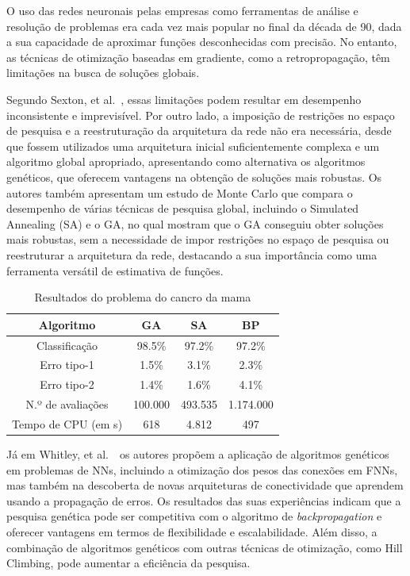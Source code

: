 O uso das redes neuronais pelas empresas como ferramentas de análise e resolução de problemas era cada vez mais popular no final da década de 90, dada a sua capacidade de aproximar funções desconhecidas com precisão.
No entanto, as técnicas de otimização baseadas em gradiente, como a retropropagação, têm limitações na busca de soluções globais.

Segundo Sexton, et al.~\cite{Sexton1998, Sexton1999}, essas limitações podem resultar em desempenho inconsistente e imprevisível.
Por outro lado, a imposição de restrições no espaço de pesquisa e a reestruturação da arquitetura da rede não era necessária, desde que fossem utilizados uma arquitetura inicial suficientemente complexa e um algoritmo global apropriado, apresentando como alternativa os algoritmos genéticos, que oferecem vantagens na obtenção de soluções mais robustas.
Os autores também apresentam um estudo de Monte Carlo que compara o desempenho de várias técnicas de pesquisa global, incluindo o Simulated Annealing (SA) e o GA, no qual mostram que o GA conseguiu obter soluções mais robustas, sem a necessidade de impor restrições no espaço de pesquisa ou reestruturar a arquitetura da rede, destacando a sua importância como uma ferramenta versátil de estimativa de funções.

\begin{table}[htbp]
    \centering
    \caption{Resultados do problema do cancro da mama\cite{Sexton1999}}
    \begin{tabular}{cccc}
        \hline
        Algoritmo & GA      & SA      & BP        \\ \hline
        Classificação     & 98.5\%  & 97.2\%  & 97.2\%    \\
        Erro tipo-1       & 1.5\%   & 3.1\%   & 2.3\%     \\
        Erro tipo-2       & 1.4\%   & 1.6\%   & 4.1\%     \\
        N.º de avaliações & 100.000 & 493.535 & 1.174.000 \\
        Tempo de CPU (em s)
        & 618     & 4.812   & 497       \\ \hline
    \end{tabular}
    \label{tab:breastcancer}
\end{table}

Já em Whitley, et al.~\cite{Whitley1990}\, os autores propõem a aplicação de algoritmos genéticos em problemas de NNs, incluindo a otimização dos pesos das conexões em FNNs, mas também na descoberta de novas arquiteturas de conectividade que aprendem usando a propagação de erros.
Os resultados das suas experiências indicam que a pesquisa genética pode ser competitiva com o algoritmo de \textit{backpropagation} e oferecer vantagens em termos de flexibilidade e escalabilidade.
Além disso, a combinação de algoritmos genéticos com outras técnicas de otimização, como Hill Climbing, pode aumentar a eficiência da pesquisa.

